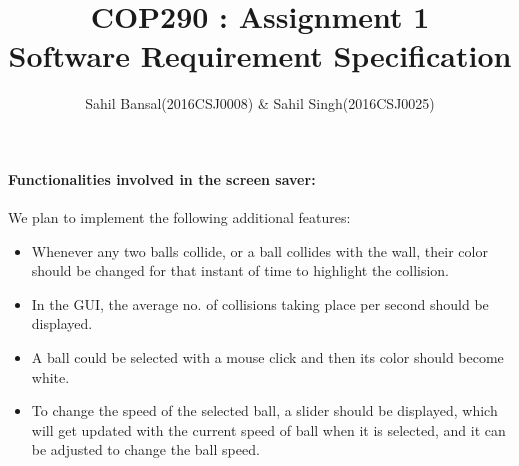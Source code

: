 \documentclass[]{article}
\title{\textbf{COP290 : Assignment 1\\Software Requirement Specification}}
\author{Sahil Bansal(2016CSJ0008) \& Sahil Singh(2016CSJ0025)}
\begin{document}
\maketitle
\vspace{1ex}
\paragraph{
	\LARGE{Functionalities involved in the screen saver:}\newline
}
\Large
We plan to implement the following additional features:
\begin{itemize}
	\item Whenever any two balls collide, or a ball collides with the wall, their color should be changed for that instant of time to highlight the collision.
	\item In the GUI, the average no. of collisions taking place per second should be displayed.
	\item A ball could be selected with a mouse click and then its color should become white.
	\item To change the speed of the selected ball, a slider should be displayed, which will get updated with the current speed of ball when it is selected, and it can be adjusted to change the ball speed. 
\end{itemize}
\end{document}
